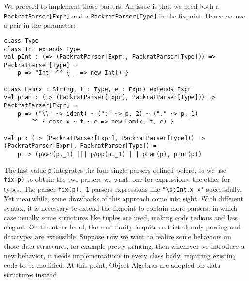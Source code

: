 We proceed to implement those parsers. An issue is that we need both a \lstinline{PackratParser[Expr]} and a \lstinline{PackratParser[Type]} in the fixpoint.
Hence we use a pair in the parameter:
\begin{lstlisting}
class Type
class Int extends Type
val pInt : (=> (PackratParser[Expr], PackratParser[Type])) => PackratParser[Type] =
    p => "Int" ^^ { _ => new Int() }

class Lam(x : String, t : Type, e : Expr) extends Expr
val pLam : (=> (PackratParser[Expr], PackratParser[Type])) => PackratParser[Expr] =
    p => ("\\" ~> ident) ~ (":" ~> p._2) ~ ("." ~> p._1)
        ^^ { case x ~ t ~ e => new Lam(x, t, e) }

val p : (=> (PackratParser[Expr], PackratParser[Type])) => (PackratParser[Expr], PackratParser[Type]) =
    p => (pVar(p._1) ||| pApp(p._1) ||| pLam(p), pInt(p))
\end{lstlisting}
The last value \lstinline{p} integrates the four single parsers defined before, so we use \lstinline{fix(p)} to
obtain the two parsers we want: one for expressions, the other for types. The parser \lstinline{fix(p)._1} parsers expressions
like \lstinline{"\x:Int.x x"} successfully. Yet meanwhile, some drawbacks of this approach come into sight. With different syntax, it
is necessary to extend the fixpoint to contain more parsers, in which case usually some structures like tuples are used,
making code tedious and less elegant. On the other hand, the modularity is quite restricted; only parsing and datatypes are extensible.
Suppose now we want to realize some behaviors on those data structures, for example pretty-printing, then whenever we introduce a new behavior,
it needs implementations in every class body, requiring existing code to be modified. At this point, Object Algebras are adopted for data structures
instead.

